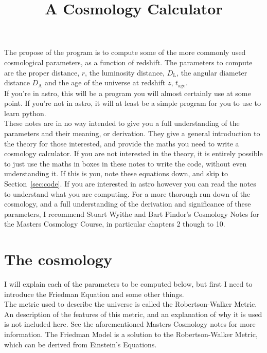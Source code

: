 \documentclass[]{article}
\begin{document}
\title{A Cosmology Calculator }
\maketitle

\noindent The propose of the program is to compute some of the more commonly used cosmological parameters, as a function of redshift. The parameters to compute are the proper distance, $r$, the luminosity distance, $D_\mathrm{L}$, the angular diameter distance $D_\mathrm{A}$ and the age of the universe at redshift $z$, $t_\mathrm{age}$. \\

\noindent If you're in astro, this will be a program you will almost certainly use at some point. If you're not in astro, it will at least be a simple program for you to use to learn python. \\

\noindent These notes are in no way intended to give you a full understanding of the parameters and their meaning, or derivation. They give a general introduction to the theory for those interested, and provide the maths you need to write a cosmology calculator. If you are not interested in the theory, it is entirely possible to just use the maths in boxes in these notes to write the code, without even understanding it. If this is you, note these equations down, and skip to Section~\ref{sec:code}. If you are interested in astro however you can read the notes to understand what you are computing. For a more thorough run down of the cosmology, and a full understanding of the derivation and significance of these parameters, I recommend Stuart Wyithe and Bart Pindor's Cosmology Notes for the Masters Cosmology Course, in particular chapters 2 though to 10. \\

\section{The cosmology}

\noindent I will explain each of the parameters to be computed below, but first I need to introduce the Friedman Equation and some other things.\\

\noindent The metric used to describe the universe is called the Robertson-Walker Metric. An description of the features of this metric, and an explanation of why it is used is not included here. See the aforementioned Masters Cosmology notes for more information. The Friedman Model is a solution to the Robertson-Walker Metric, which can be derived from Einstein’s Equations.\\
\end{document}
